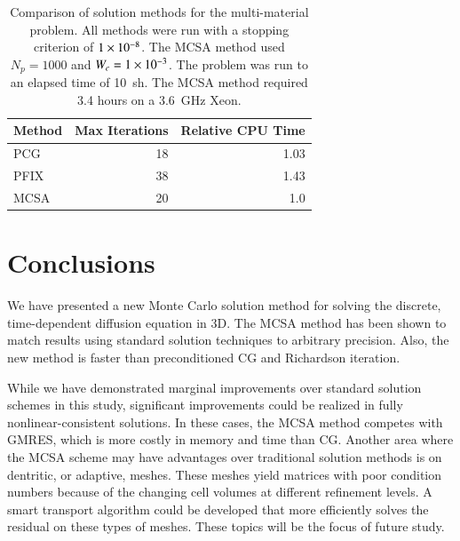 \documentclass[preprint,12pt]{elsarticle}
\begin{document}
\begin{table}[htpb!]
  \begin{center}
    \begin{tabular}{lrr}\hline\hline
      \multicolumn{1}{c}{Method} & 
      \multicolumn{1}{c}{Max Iterations} & 
      \multicolumn{1}{c}{Relative CPU Time}\\\hline\hline
      PCG & 18 & 1.03 \\
      PFIX & 38 & 1.43 \\
      MCSA & 20 & 1.0 \\
      \hline\hline
    \end{tabular}
  \end{center}
  \caption{
    Comparison of solution methods for the multi-material problem. All
    methods were run with a stopping criterion of $1\times 10^{-8}$.  The
    MCSA method used $N_p=1000$ and $W_c = 1\times 10^{-3}$.  The problem
    was run to an elapsed time of 10~sh.  The MCSA method required 3.4
    hours on a 3.6~GHz Xeon.}
  \label{tab:multimat_comparison}
\end{table}

\section{Conclusions}
\label{sec:conclusions}

We have presented a new Monte Carlo solution method for solving the
discrete, time-dependent diffusion equation in 3D.  The MCSA method
has been shown to match results using standard solution techniques to
arbitrary precision.  Also, the new method is faster than
preconditioned CG and Richardson iteration.

While we have demonstrated marginal improvements over standard
solution schemes in this study, significant improvements could be
realized in fully nonlinear-consistent solutions.  In these cases, the
MCSA method competes with GMRES, which is more costly in memory and
time than CG.  Another area where the MCSA scheme may have advantages
over traditional solution methods is on dentritic, or adaptive,
meshes.  These meshes yield matrices with poor condition numbers
because of the changing cell volumes at different refinement levels.
A smart transport algorithm could be developed that more efficiently
solves the residual on these types of meshes.  These topics will be
the focus of future study.


\end{document}
